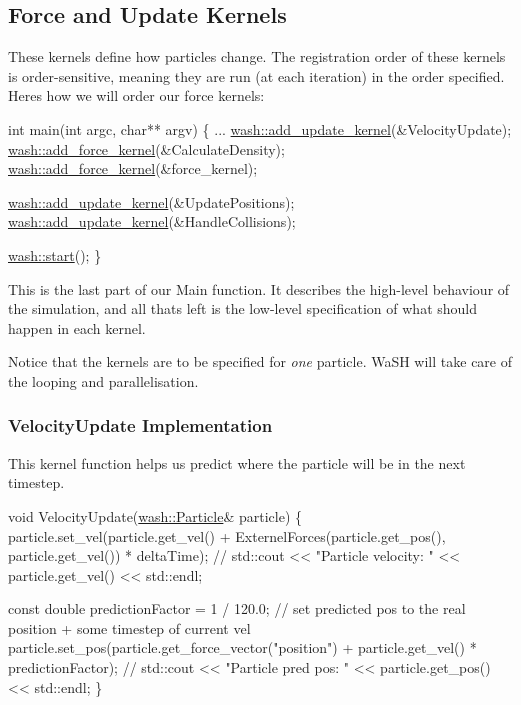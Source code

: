 \subsection*{Force and Update Kernels}

These kernels define how particles change. The registration order of these kernels is order-\/sensitive, meaning they are run (at each iteration) in the order specified. Here\textquotesingle{}s how we will order our force kernels\+: 
\begin{DoxyCode}
\textcolor{keywordtype}{int} main(\textcolor{keywordtype}{int} argc, \textcolor{keywordtype}{char}** argv) \{
    ...
    \mbox{\hyperlink{namespacewash_abc27c958fb1156da77a1346c3559abc1}{wash::add\_update\_kernel}}(&VelocityUpdate);
    \mbox{\hyperlink{namespacewash_a2ffa21a9e32d3ca6ce87def3e7db4837}{wash::add\_force\_kernel}}(&CalculateDensity);
    \mbox{\hyperlink{namespacewash_a2ffa21a9e32d3ca6ce87def3e7db4837}{wash::add\_force\_kernel}}(&force\_kernel);

    \mbox{\hyperlink{namespacewash_abc27c958fb1156da77a1346c3559abc1}{wash::add\_update\_kernel}}(&UpdatePositions);
    \mbox{\hyperlink{namespacewash_abc27c958fb1156da77a1346c3559abc1}{wash::add\_update\_kernel}}(&HandleCollisions);

    \mbox{\hyperlink{namespacewash_a4c8a9913a535b341da9e72826916544b}{wash::start}}();
\}
\end{DoxyCode}
 This is the last part of our Main function. It describes the high-\/level behaviour of the simulation, and all that\textquotesingle{}s left is the low-\/level specification of what should happen in each kernel.

Notice that the kernels are to be specified for {\itshape one} particle. Wa\+SH will take care of the looping and parallelisation.

\subsubsection*{Velocity\+Update Implementation}

This kernel function helps us predict where the particle will be in the next timestep. 
\begin{DoxyCode}
\textcolor{keywordtype}{void} VelocityUpdate(\mbox{\hyperlink{classwash_1_1Particle}{wash::Particle}}& particle) \{
    particle.set\_vel(particle.get\_vel() + ExternelForces(particle.get\_pos(), particle.get\_vel()) * 
      deltaTime);
    \textcolor{comment}{// std::cout << "Particle velocity: " << particle.get\_vel() << std::endl;}

    \textcolor{keyword}{const} \textcolor{keywordtype}{double} predictionFactor = 1 / 120.0;
    \textcolor{comment}{// set predicted pos to the real position + some timestep of current vel}
    particle.set\_pos(particle.get\_force\_vector(\textcolor{stringliteral}{"position"}) + particle.get\_vel() * predictionFactor);
    \textcolor{comment}{// std::cout << "Particle pred pos: " << particle.get\_pos() << std::endl;}
\}
\end{DoxyCode}


